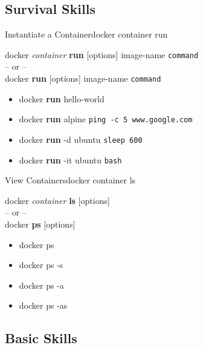 \documentclass{beamer}
\begin{document}
\subsection{Survival Skills}
\begin{frame}{Instantiate a Container}{docker container run}

{\Large 
docker \textit{container} \textbf{run} [options] \alert{image-name} \texttt{command} \\ -- or -- \\
docker \textbf{run} [options] \alert{image-name} \texttt{command} \\ 

\hrulefill
\begin{itemize}
    \item docker \textbf{run} \alert{hello-world}
    \item docker \textbf{run} \alert{alpine} \texttt{ping -c 5 www.google.com}
    \item docker \textbf{run} -d \alert{ubuntu} \texttt{sleep 600}
    \item docker \textbf{run} -it \alert{ubuntu} \texttt{bash}
\end{itemize}
}
\end{frame}
	
\begin{frame}{View Containers}{docker container ls}

{\Large 
docker \textit{container} \textbf{ls} [options]  \\ -- or -- \\
docker \textbf{ps} [options]  \\ 

\hrulefill
\begin{itemize}
    \item docker \alert{ps} 
    \item docker \alert{ps} -s
    \item docker \alert{ps} -a
    \item docker \alert{ps} -as
\end{itemize}
}
	
\end{frame}

\subsection{Basic Skills}
\end{document}
